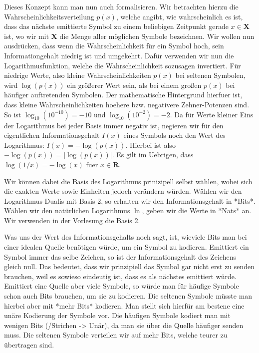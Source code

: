Dieses Konzept kann man nun auch formalisieren. Wir betrachten hierzu die
Wahrscheinlichkeitsverteilung $p(x)$, welche angibt, wie wahrscheinlich es ist,
dass das nächste emittierte Symbol zu einem beliebigen Zeitpunkt gerade $x \in
\mathbf{X}$ ist, wo wir mit $\mathbf{X}$ die Menge aller möglichen Symbole
bezeichnen. Wir wollen nun ausdrücken, dass wenn die Wahrscheinlichkeit für ein
Symbol hoch, sein Informationgehalt niedrig ist und umgekehrt. Dafür verwenden
wir nun die Logarithmusfunktion, welche die Wahrscheinlichkeit sozusagen
invertiert. Für niedrige Werte, also kleine Wahrscheinlichkeiten $p(x)$ bei
seltenen Symbolen, wird $\log(p(x))$ ein größerer Wert sein, als bei einem
großen $p(x)$ bei häufiger auftretenden Symbolen. Der mathematische Hintergrund
hierfuer ist, dass kleine Wahrscheinlichkeiten hoehere bzw. negativere
Zehner-Potenzen sind. So ist $\log_{10}(10^{-10}) = -10$ und $\log_{10}(10^{-2})
= -2$. Da für Werte kleiner Eins der Logarithmus bei jeder Basis immer negativ
ist, negieren wir für den eigentlichen Informationsgehalt $I(x)$ eines Symbols
noch den Wert des Logarithmus: $I(x) = -\log(p(x))$. Hierbei ist also
$-\log(p(x)) = |\log(p(x))|$. Es gilt im Uebrigen, dass $\log(1/x) = -\log(x)$
fuer $x \in \mathbf{R}$.

Wir können dabei die Basis des Logarithmus prinizipell selbst wählen, wobei sich
die exakten Werte sowie Einheiten jedoch verändern würden. Wählen wir den
Logarithmus Dualis mit Basis 2, so erhalten wir den Informationsgehalt in
*Bits*. Wählen wir den natürlichen Logarithmus $\ln$, geben wir die Werte in
*Nats* an. Wir verwenden in der Vorlesung die Basis 2.

Was uns der Wert des Informationsgehalts noch sagt, ist, wieviele Bits man bei
einer idealen Quelle benötigen würde, um ein Symbol zu kodieren. Emittiert ein
Symbol immer das selbe Zeichen, so ist der Informationsgehalt des Zeichens
gleich null. Das bedeutet, dass wir prinzipiell das Symbol gar nicht erst zu
senden brauchen, weil es sowieso eindeutig ist, dass es als nächstes emittiert
würde. Emittiert eine Quelle aber viele Symbole, so würde man für häufige
Symbole schon auch Bits brauchen, um sie zu kodieren. Die seltenen Symbole
müsste man hierbei aber mit *mehr Bits* kodieren. Man stellt sich hierfür am
bestene eine unäre Kodierung der Symbole vor. Die häufigen Symbole kodiert man
mit wenigen Bits (/Strichen -> Unär), da man sie über die Quelle häufiger senden
muss. Die seltenen Symbole verteilen wir auf mehr Bits, welche teurer zu
übertragen sind.

